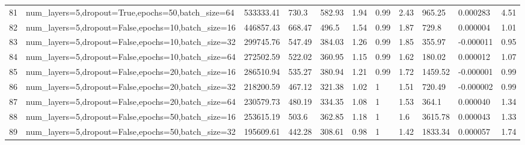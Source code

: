 \begin{longtable}{C{0.8cm} L{2cm} C{1.15cm} C{1.15cm} C{1.15cm} C{1.15cm} C{0.85cm} C{1.25cm} C{1.2cm} C{1.5cm} C{1.0cm}}
81 & num\_layers=5,\newline dropout=True,\newline epochs=50,\newline batch\_size=64 & 533333.41 & 730.3 & 582.93 & 1.94 & 0.99 & 2.43 & 965.25 & 0.000283 & 4.51 \\
82 & num\_layers=5,\newline dropout=False,\newline epochs=10,\newline batch\_size=16 & 446857.43 & 668.47 & 496.5 & 1.54 & 0.99 & 1.87 & 729.8 & 0.000004 & 1.01 \\
83 & num\_layers=5,\newline dropout=False,\newline epochs=10,\newline batch\_size=32 & 299745.76 & 547.49 & 384.03 & 1.26 & 0.99 & 1.85 & 355.97 & -0.000011 & 0.95 \\
84 & num\_layers=5,\newline dropout=False,\newline epochs=10,\newline batch\_size=64 & 272502.59 & 522.02 & 360.95 & 1.15 & 0.99 & 1.62 & 180.02 & 0.000012 & 1.07 \\
85 & num\_layers=5,\newline dropout=False,\newline epochs=20,\newline batch\_size=16 & 286510.94 & 535.27 & 380.94 & 1.21 & 0.99 & 1.72 & 1459.52 & -0.000001 & 0.99 \\
86 & num\_layers=5,\newline dropout=False,\newline epochs=20,\newline batch\_size=32 & 218200.59 & 467.12 & 321.38 & 1.02 & 1 & 1.51 & 720.49 & -0.000002 & 0.99 \\
87 & num\_layers=5,\newline dropout=False,\newline epochs=20,\newline batch\_size=64 & 230579.73 & 480.19 & 334.35 & 1.08 & 1 & 1.53 & 364.1 & 0.000040 & 1.34 \\
88 & num\_layers=5,\newline dropout=False,\newline epochs=50,\newline batch\_size=16 & 253615.19 & 503.6 & 362.85 & 1.18 & 1 & 1.6 & 3615.78 & 0.000043 & 1.33 \\
89 & num\_layers=5,\newline dropout=False,\newline epochs=50,\newline batch\_size=32 & 195609.61 & 442.28 & 308.61 & 0.98 & 1 & 1.42 & 1833.34 & 0.000057 & 1.74 \\

\end{longtable}
